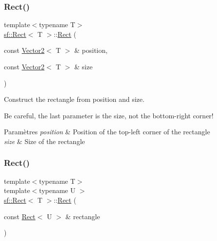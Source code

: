 \subsubsection{\texorpdfstring{Rect()}{Rect()}\hspace{0.1cm}{\footnotesize\ttfamily [3/4]}}
{\footnotesize\ttfamily template$<$typename T$>$ \\
\hyperlink{classsf_1_1Rect}{sf\+::\+Rect}$<$ T $>$\+::\hyperlink{classsf_1_1Rect}{Rect} (\begin{DoxyParamCaption}\item[{const \hyperlink{classsf_1_1Vector2}{Vector2}$<$ T $>$ \&}]{position,  }\item[{const \hyperlink{classsf_1_1Vector2}{Vector2}$<$ T $>$ \&}]{size }\end{DoxyParamCaption})}



Construct the rectangle from position and size. 

Be careful, the last parameter is the size, not the bottom-\/right corner!


\begin{DoxyParams}{Paramètres}
{\em position} & Position of the top-\/left corner of the rectangle \\
\hline
{\em size} & Size of the rectangle \\
\hline
\end{DoxyParams}
\mbox{\label{classsf_1_1Rect_a6fff2bb7e93677839461a66bc2957de0}} 
\subsubsection{\texorpdfstring{Rect()}{Rect()}\hspace{0.1cm}{\footnotesize\ttfamily [4/4]}}
{\footnotesize\ttfamily template$<$typename T$>$ \\
template$<$typename U $>$ \\
\hyperlink{classsf_1_1Rect}{sf\+::\+Rect}$<$ T $>$\+::\hyperlink{classsf_1_1Rect}{Rect} (\begin{DoxyParamCaption}\item[{const \hyperlink{classsf_1_1Rect}{Rect}$<$ U $>$ \&}]{rectangle }\end{DoxyParamCaption})\hspace{0.3cm}{\ttfamily [explicit]}}



